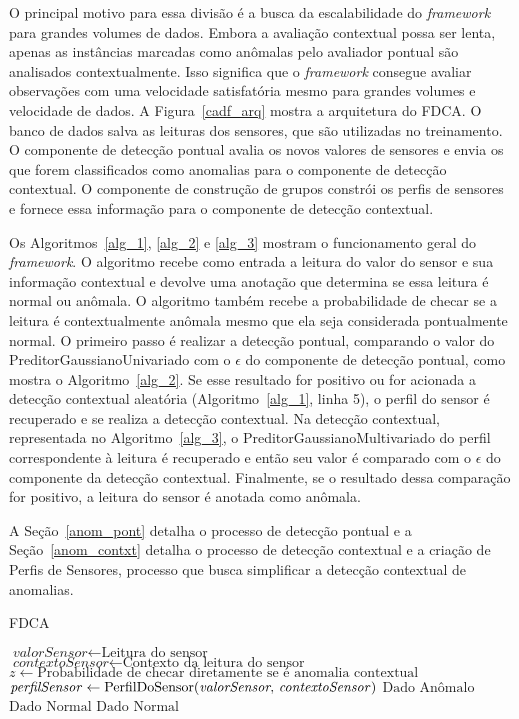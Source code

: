 \documentclass[cic,tc]{iiufrgs}
\begin{document}
O principal motivo para essa divisão é a busca da escalabilidade do \textit{framework} para grandes volumes de dados. Embora a avaliação contextual possa ser lenta, apenas as instâncias marcadas como anômalas pelo avaliador pontual são analisados contextualmente. Isso significa que o \textit{framework} consegue avaliar observações com uma velocidade satisfatória mesmo para grandes volumes e velocidade de dados. A Figura~\ref{cadf_arq} mostra a arquitetura do FDCA. O banco de dados salva as leituras dos sensores, que são utilizadas no treinamento. O componente de detecção pontual avalia os novos valores de sensores e envia os que forem classificados como anomalias para o componente de detecção contextual. O componente de construção de grupos constrói os perfis de sensores e fornece essa informação para o componente de detecção contextual.

Os Algoritmos~\ref{alg_1}, \ref{alg_2} e \ref{alg_3} mostram o funcionamento geral do \textit{framework}. O algoritmo recebe como entrada a leitura do valor do sensor e sua informação contextual e devolve uma anotação que determina se essa leitura é normal ou anômala. O algoritmo também recebe a probabilidade de checar se a leitura é contextualmente anômala mesmo que ela seja considerada pontualmente normal. O primeiro passo é realizar a detecção pontual, comparando o valor do PreditorGaussianoUnivariado com o $\epsilon$ do componente de detecção pontual, como mostra o Algoritmo~\ref{alg_2}. Se esse resultado for positivo ou for acionada a detecção contextual aleatória (Algoritmo~\ref{alg_1}, linha 5), o perfil do sensor é recuperado e se realiza a detecção contextual. Na detecção contextual, representada no Algoritmo~\ref{alg_3}, o PreditorGaussianoMultivariado do perfil correspondente à leitura é recuperado e então seu valor é comparado com o $\epsilon$ do componente da detecção contextual. Finalmente, se o resultado dessa comparação for positivo, a leitura do sensor é anotada como anômala.

A Seção~\ref{anom_pont} detalha o processo de detecção pontual e a Seção~\ref{anom_contxt} detalha o processo de detecção contextual e a criação de Perfis de Sensores, processo que busca simplificar a detecção contextual de anomalias. 

\bigskip
\begin{algorithm}
\caption{FDCA}
\label{alg_1}
\begin{algorithmic}[1]
\State $\textit{valorSensor} \gets \text{Leitura do sensor}$
\State $\textit{contextoSensor} \gets \text{Contexto da leitura do sensor}$
\State $z \gets \text{Probabilidade de checar diretamente se é anomalia contextual}$
\State $\text{\textit{perfilSensor}} \gets \text{PerfilDoSensor(\textit{valorSensor}, \textit{contextoSensor})}$
\State \Return $\text{Dado An\^omalo}$
\Else
\State \Return $\text{Dado Normal}$
\EndIf
\Else
\State \Return $\text{Dado Normal}$
\EndIf
\EndProcedure
\end{algorithmic}
\end{algorithm}
\end{document}
